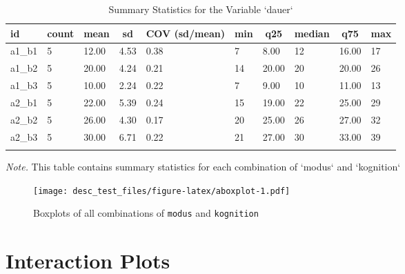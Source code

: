 \documentclass[
  doc,floatsintext]{apa6}
\begin{document}
\begin{table}[tbp]

\begin{center}
\begin{threeparttable}

\caption{\label{tab:tabsummary}Summary Statistics for the Variable `dauer`}

\begin{tabular}{llllllllll}
\toprule
id & \multicolumn{1}{c}{count} & \multicolumn{1}{c}{mean} & \multicolumn{1}{c}{sd} & \multicolumn{1}{c}{COV (sd/mean)} & \multicolumn{1}{c}{min} & \multicolumn{1}{c}{q25} & \multicolumn{1}{c}{median} & \multicolumn{1}{c}{q75} & \multicolumn{1}{c}{max}\\
\midrule
a1\_b1 & 5 & 12.00 & 4.53 & 0.38 & 7 & 8.00 & 12 & 16.00 & 17\\
a1\_b2 & 5 & 20.00 & 4.24 & 0.21 & 14 & 20.00 & 20 & 20.00 & 26\\
a1\_b3 & 5 & 10.00 & 2.24 & 0.22 & 7 & 9.00 & 10 & 11.00 & 13\\
a2\_b1 & 5 & 22.00 & 5.39 & 0.24 & 15 & 19.00 & 22 & 25.00 & 29\\
a2\_b2 & 5 & 26.00 & 4.30 & 0.17 & 20 & 25.00 & 26 & 27.00 & 32\\
a2\_b3 & 5 & 30.00 & 6.71 & 0.22 & 21 & 27.00 & 30 & 33.00 & 39\\
\bottomrule
\addlinespace
\end{tabular}

\begin{tablenotes}[para]
\normalsize{\textit{Note.} This table contains summary statistics for each combination of `modus` and `kognition`}
\end{tablenotes}

\end{threeparttable}
\end{center}

\end{table}

\begin{figure}
\centering
\texttt{[image: desc\_test\_files/figure-latex/aboxplot-1.pdf]}
\caption{\label{fig:aboxplot}Boxplots of all combinations of \texttt{modus} and \texttt{kognition}}
\end{figure}

\clearpage

\hypertarget{interaction-plots}{%
\section{Interaction Plots}\label{interaction-plots}}
\end{document}
